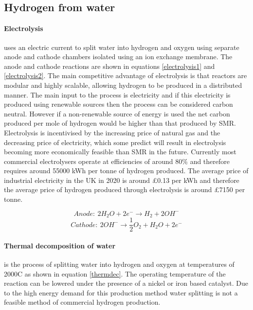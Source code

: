 \subsection{Hydrogen from water}

\paragraph{Electrolysis} uses an electric current to split water into hydrogen and oxygen using separate anode and cathode chambers isolated using an ion exchange membrane. The anode and cathode reactions are shown in equations \ref{electrolysis1} and \ref{electrolysis2}. The main competitive advantage of electrolysis is that reactors are modular and highly scalable, allowing hydrogen to be produced in a distributed manner. \cite{Acar2014} The main input to the process is electricity and if this electricity is produced using renewable sources then the process can be considered carbon neutral. However if a non-renewable source of energy is used the net carbon produced per mole of hydrogen would be higher than that produced by SMR. \cite{Koroneos2004}
Electrolysis is incentivised by the increasing price of natural gas and the decreasing price of electricity, which some predict will result in electrolysis becoming more economically feasible than SMR in the future. \cite{Acar2014} Currently most commercial electrolysers operate at efficiencies of around 80\% and therefore requires around 55000 kWh per tonne of hydrogen produced. The average price of industrial electricity in the UK in 2020 is around £0.13 per kWh \cite{departmentforbusinessenergyindustrialstrategy_2020} and therefore the average price of hydrogen produced through electrolysis is around £7150 per tonne. \cite{hydrogencouncil_2020}


\begin{equation}\label{electrolysis1}
Anode: \: 2H_2 O +  2e^- \rightarrow H_2 + 2OH^-
\end{equation}
\begin{equation}\label{electrolysis2}
Cathode: \: 2OH^- \rightarrow \frac{1}{2}O_2+ H_2 O + 2e^-
\end{equation}

\paragraph{Thermal decomposition of water} is the process of splitting water into hydrogen and oxygen at temperatures of 2000\textdegree C as shown in equation \ref{thermdec}. \cite{Holladay2009} The operating temperature of the reaction can be lowered under the presence of a nickel or iron based catalyst. \cite{Holladay2009} Due to the high energy demand for this production method water splitting is not a feasible method of commercial hydrogen production.

